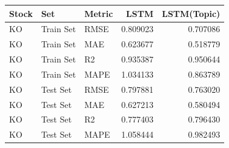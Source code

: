\begin{tabular}{lllrr}
\toprule
Stock & Set & Metric & LSTM & LSTM(Topic) \\
\midrule
KO & Train Set & RMSE & 0.809023 & 0.707086 \\
KO & Train Set & MAE & 0.623677 & 0.518779 \\
KO & Train Set & R2 & 0.935387 & 0.950644 \\
KO & Train Set & MAPE & 1.034133 & 0.863789 \\
KO & Test Set & RMSE & 0.797881 & 0.763020 \\
KO & Test Set & MAE & 0.627213 & 0.580494 \\
KO & Test Set & R2 & 0.777403 & 0.796430 \\
KO & Test Set & MAPE & 1.058444 & 0.982493 \\
\bottomrule
\end{tabular}
